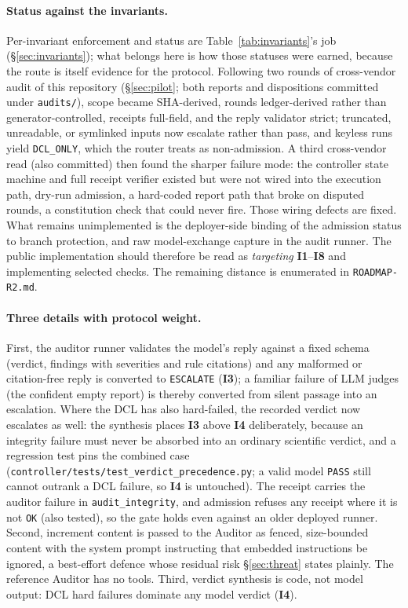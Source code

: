 \documentclass[11pt]{article}
\newcommand{\invariant}[1]{\textbf{I#1}}
\begin{document}
\paragraph{Status against the invariants.} Per-invariant enforcement and status are Table~\ref{tab:invariants}'s job (\S\ref{sec:invariants}); what belongs here is how those statuses were earned, because the route is itself evidence for the protocol. Following two rounds of cross-vendor audit of this repository (\S\ref{sec:pilot}; both reports and dispositions committed under \texttt{audits/}), scope became SHA-derived, rounds ledger-derived rather than generator-controlled, receipts full-field, and the reply validator strict; truncated, unreadable, or symlinked inputs now escalate rather than pass, and keyless runs yield \texttt{DCL\_ONLY}, which the router treats as non-admission. A third cross-vendor read (also committed) then found the sharper failure mode: the controller state machine and full receipt verifier existed but were not wired into the execution path, dry-run admission, a hard-coded report path that broke on disputed rounds, a constitution check that could never fire. Those wiring defects are fixed. What remains unimplemented is the deployer-side binding of the admission status to branch protection, and raw model-exchange capture in the audit runner. The public implementation should therefore be read as \emph{targeting} \invariant{1}--\invariant{8} and implementing selected checks. The remaining distance is enumerated in \texttt{ROADMAP-R2.md}. \paragraph{Three details with protocol weight.} First, the auditor runner validates the model's reply against a fixed schema (verdict, findings with severities and rule citations) and any malformed or citation-free reply is converted to \texttt{ESCALATE} (\invariant{3}); a familiar failure of LLM judges (the confident empty report) is thereby converted from silent passage into an escalation. Where the DCL has also hard-failed, the recorded verdict now escalates as well: the synthesis places \invariant{3} above \invariant{4} deliberately, because an integrity failure must never be absorbed into an ordinary scientific verdict, and a regression test pins the combined case (\texttt{controller/tests/test\_verdict\_precedence.py}; a valid model \texttt{PASS} still cannot outrank a DCL failure, so \invariant{4} is untouched). The receipt carries the auditor failure in \texttt{audit\_integrity}, and admission refuses any receipt where it is not \texttt{OK} (also tested), so the gate holds even against an older deployed runner. Second, increment content is passed to the Auditor as fenced, size-bounded content with the system prompt instructing that embedded instructions be ignored, a best-effort defence whose residual risk \S\ref{sec:threat} states plainly. The reference Auditor has no tools. Third, verdict synthesis is code, not model output: DCL hard failures dominate any model verdict (\invariant{4}).
\end{document}
